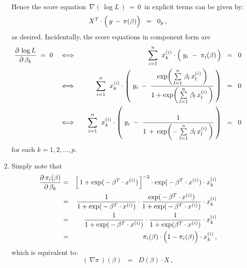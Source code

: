 \begin{enumerate}
	Hence the score equation
	\,$\nabla\!\left(\,\log L\,\right) \,=\, 0$\,
	in explicit terms can be given by:
	\begin{equation*}
	X^{T} \cdot \left(\, y \,\overset{{\color{white}.}}{-}\, \pi(\beta) \right) \;\; = \;\; 0_{p}\,,
	\end{equation*}
	as desired.
	Incidentally, the score equations in component form are
	\begin{eqnarray*}
	\dfrac{\partial\,\log L}{\partial\,\beta_{k}} \;=\; 0
	&\quad\Longleftrightarrow\quad&
		\overset{n}{\underset{i=1}{\sum}}\;\;
		x^{(i)}_{k} 
		\cdot
		\left(\; y_{i} \; \overset{{\color{white}.}}{-} \; \pi_{i}(\beta) \,\right)
		\;\; = \;\; 0
	\\
	&\quad\Longleftrightarrow\quad&
		\overset{n}{\underset{i=1}{\sum}}\;\;
		x^{(i)}_{k} 
		\cdot
		\left(\;
			y_{i}
			\;\overset{{\color{white}.}}{-}\;
			\dfrac{
				\exp\!\left(\,\overset{n}{\underset{l=1}{\sum}}\;\beta_{l}\,x^{(i)}_{l}\,\right)
				}{
				1 + \exp\!\left(\,\overset{n}{\underset{l=1}{\sum}}\;\beta_{l}\,x^{(i)}_{l}\,\right)
				}
			\,\right)
		\;\; = \;\; 0
	\\
	&\quad\Longleftrightarrow\quad&
		\overset{n}{\underset{i=1}{\sum}}\;\;
		x^{(i)}_{k} 
		\cdot
		\left(\;
			y_{i}
			\;\overset{{\color{white}.}}{-}\;
			\dfrac{1}{1 \,+\, \exp\!\left({\color{red}-}\;\overset{n}{\underset{l=1}{\sum}}\;\beta_{l}\,x^{(i)}_{l}\,\right)}
			\,\right)
		\;\; = \;\; 0
	\end{eqnarray*}
	for each $k = 1,2,\ldots,p$.
\item
	Simply note that
	\begin{eqnarray*}
	\dfrac{\partial\,\pi_{i}(\beta)}{\partial\,\beta_{k}}
	&=&
		\left[\,1+\exp(\,-\,\beta^{T}\cdot x^{(i)})\,\right]^{-2}
		\cdot
		\exp(\,-\,\beta^{T}\cdot x^{(i)})
		\cdot
		x^{(i)}_{k}
	\\
	&=&
		\dfrac{1}{1+\exp(\,-\,\beta^{T}\cdot x^{(i)})}
		\cdot
		\dfrac{\exp(\,-\,\beta^{T}\cdot x^{(i)})}{1+\exp(\,-\,\beta^{T}\cdot x^{(i)})}
		\cdot
		x^{(i)}_{k}
	\\
	&=&
		\dfrac{1}{1+\exp(\,-\,\beta^{T}\cdot x^{(i)})}
		\cdot
		\dfrac{1}{1+\exp(\beta^{T}\cdot x^{(i)})}
		\cdot
		x^{(i)}_{k}
	\\
	&=&
		\pi_{i}(\beta)
		\cdot
		\left(1\overset{{\color{white}.}}{-}\pi_{i}(\beta)\right)
		\cdot
		x^{(i)}_{k}\,,
	\end{eqnarray*}
	which is equivalent to:
	\begin{equation*}
	\left(\,\nabla\pi\,\right)(\beta)
	\;\; = \;\;
		D(\beta) \cdot X\,,

\end{equation*}
\end{enumerate}
